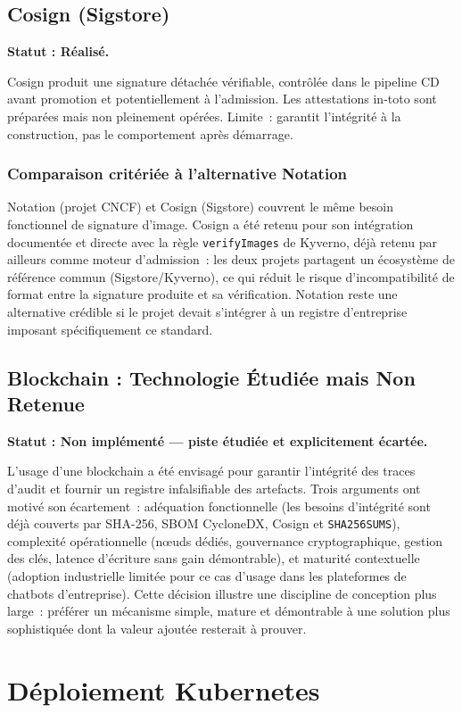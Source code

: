 \subsection{Cosign (Sigstore)}
\textbf{Statut : Réalisé.}

Cosign produit une signature détachée vérifiable, contrôlée dans le pipeline CD avant promotion et potentiellement à l'admission. Les attestations in-toto sont préparées mais non pleinement opérées. Limite~: garantit l'intégrité à la construction, pas le comportement après démarrage.

\subsubsection{Comparaison critériée à l'alternative Notation}
Notation (projet CNCF) et Cosign (Sigstore) couvrent le même besoin fonctionnel de signature d'image. Cosign a été retenu pour son intégration documentée et directe avec la règle \texttt{verifyImages} de Kyverno, déjà retenu par ailleurs comme moteur d'admission~: les deux projets partagent un écosystème de référence commun (Sigstore/Kyverno), ce qui réduit le risque d'incompatibilité de format entre la signature produite et sa vérification. Notation reste une alternative crédible si le projet devait s'intégrer à un registre d'entreprise imposant spécifiquement ce standard.

\subsection{Blockchain : Technologie Étudiée mais Non Retenue}
\textbf{Statut : Non implémenté — piste étudiée et explicitement écartée.}

L'usage d'une blockchain a été envisagé pour garantir l'intégrité des traces d'audit et fournir un registre infalsifiable des artefacts. Trois arguments ont motivé son écartement~: adéquation fonctionnelle (les besoins d'intégrité sont déjà couverts par SHA-256, SBOM CycloneDX, Cosign et \texttt{SHA256SUMS}), complexité opérationnelle (nœuds dédiés, gouvernance cryptographique, gestion des clés, latence d'écriture sans gain démontrable), et maturité contextuelle (adoption industrielle limitée pour ce cas d'usage dans les plateformes de chatbots d'entreprise). Cette décision illustre une discipline de conception plus large~: préférer un mécanisme simple, mature et démontrable à une solution plus sophistiquée dont la valeur ajoutée resterait à prouver.

\section{Déploiement Kubernetes}

